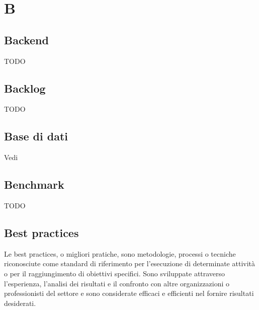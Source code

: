 \section{B}

\vspace{2em}
\subsection*{Backend}
TODO

\vspace{2em}
\subsection*{Backlog}
TODO


\vspace{2em}
\subsection*{Base di dati}
\par Vedi 

\vspace{2em}
\subsection*{Benchmark}
TODO

\vspace{2em}
\subsection*{Best practices}
Le best practices, o migliori pratiche, sono metodologie, processi o tecniche riconosciute come standard di riferimento per l'esecuzione di determinate attività o per il raggiungimento di obiettivi specifici. Sono sviluppate attraverso l'esperienza, l'analisi dei risultati e il confronto con altre organizzazioni o professionisti del settore e sono considerate efficaci e efficienti nel fornire risultati desiderati.

